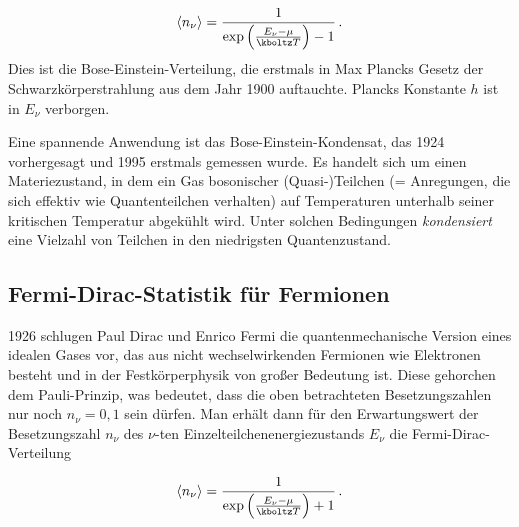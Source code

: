 \begin{equation*}
  \langle n_\nu \rangle=
    \frac{1}{\exp\left(\frac{E_\nu-\mu}{\kboltz T} \right)-1}\,.
\end{equation*}
%
Dies ist die Bose-Einstein-Verteilung, die erstmals in Max Plancks Gesetz der Schwarzkörperstrahlung aus dem Jahr 1900 auftauchte. Plancks Konstante $h$ ist in $E_\nu$ verborgen.

Eine spannende Anwendung ist das Bose-Einstein-Kondensat, das 1924 vorhergesagt und 1995 erstmals gemessen wurde. Es handelt sich um einen Materiezustand, in dem ein Gas bosonischer (Quasi-)Teilchen (= Anregungen, die sich effektiv wie Quantenteilchen verhalten) auf Temperaturen unterhalb seiner kritischen Temperatur abgekühlt wird. Unter solchen Bedingungen \emph{kondensiert} eine Vielzahl von Teilchen in den niedrigsten Quantenzustand.


\subsection*{Fermi-Dirac-Statistik für Fermionen}

1926 schlugen Paul Dirac und Enrico Fermi die quantenmechanische Version eines idealen Gases vor, das aus nicht wechselwirkenden Fermionen wie Elektronen besteht und in der Festkörperphysik von großer Bedeutung ist. Diese gehorchen dem Pauli-Prinzip, was bedeutet, dass die oben betrachteten Besetzungszahlen nur noch $n_\nu=0,1$ sein dürfen. Man erhält dann für den Erwartungswert der Besetzungszahl $n_\nu$ des $\nu$-ten Einzelteilchenenergiezustands $E_\nu$ die Fermi-Dirac-Verteilung

\begin{equation*}
  \langle n_\nu \rangle=
    \frac{1}{\exp\left(\frac{E_\nu-\mu}{\kboltz T} \right)+1}\,.
\end{equation*}
